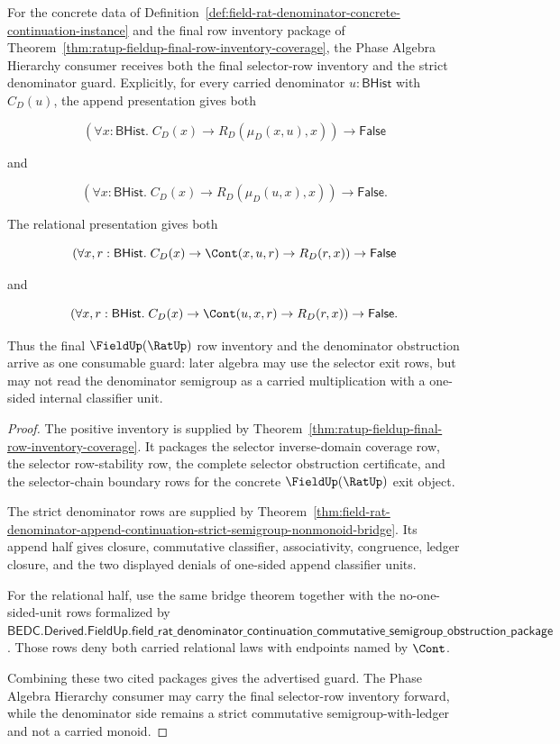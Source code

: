 \begin{theorem}
\label{thm:rat-denominator-append-continuation-final-exit-obstruction-guard}
For the concrete data of
Definition~\ref{def:field-rat-denominator-concrete-continuation-instance} and
the final row inventory package of
Theorem~\ref{thm:ratup-fieldup-final-row-inventory-coverage}, the Phase
Algebra Hierarchy consumer receives both the final selector-row inventory and
the strict denominator guard. Explicitly, for every carried denominator
$u:\mathsf{BHist}$ with $C_D(u)$, the append presentation gives both

$$
(\forall x:\mathsf{BHist}.\;
C_D(x)\to R_D(\mu_D(x,u),x))\to \mathsf{False}
$$

and

$$
(\forall x:\mathsf{BHist}.\;
C_D(x)\to R_D(\mu_D(u,x),x))\to \mathsf{False}.
$$

The relational presentation gives both

$$
(\forall x,r:\mathsf{BHist}.\;
C_D(x)\to \Cont(x,u,r)\to R_D(r,x))\to \mathsf{False}
$$

and

$$
(\forall x,r:\mathsf{BHist}.\;
C_D(x)\to \Cont(u,x,r)\to R_D(r,x))\to \mathsf{False}.
$$

Thus the final $\FieldUp(\RatUp)$ row inventory and the denominator obstruction
arrive as one consumable guard: later algebra may use the selector exit rows,
but may not read the denominator semigroup as a carried multiplication with a
one-sided internal classifier unit.
\end{theorem}
\begin{proof}
The positive inventory is supplied by
Theorem~\ref{thm:ratup-fieldup-final-row-inventory-coverage}. It packages the
selector inverse-domain coverage row, the selector row-stability row, the
complete selector obstruction certificate, and the selector-chain boundary rows
for the concrete $\FieldUp(\RatUp)$ exit object.

The strict denominator rows are supplied by
Theorem~\ref{thm:field-rat-denominator-append-continuation-strict-semigroup-nonmonoid-bridge}.
Its append half gives closure, commutative classifier, associativity,
congruence, ledger closure, and the two displayed denials of one-sided append
classifier units.

For the relational half, use the same bridge theorem together with the
no-one-sided-unit rows formalized by
$\mathsf{BEDC.Derived.FieldUp.field\_rat\_denominator\_continuation\_commutative\_semigroup\_obstruction\_package}$.
Those rows deny both carried relational laws with endpoints named by $\Cont$.

Combining these two cited packages gives the advertised guard. The Phase
Algebra Hierarchy consumer may carry the final selector-row inventory forward,
while the denominator side remains a strict commutative semigroup-with-ledger
and not a carried monoid.
\end{proof}

